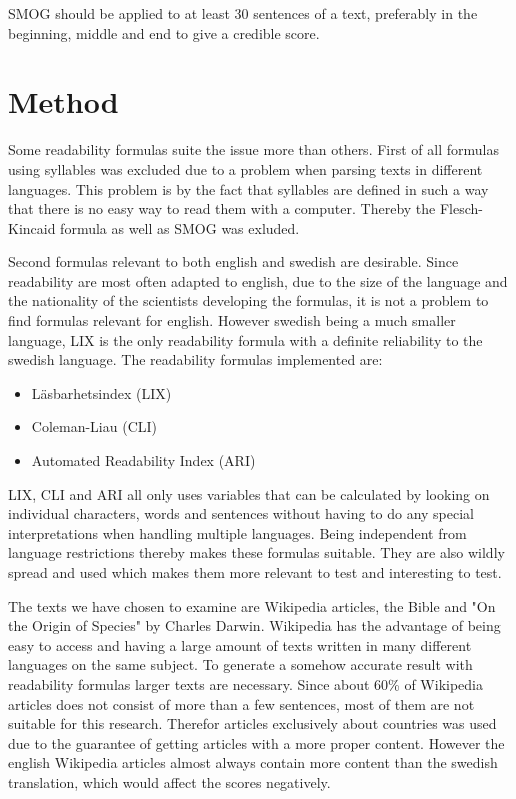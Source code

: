 \documentclass[a4paper]{article}
\begin{document}
SMOG should be applied to at least 30 sentences of a text, preferably in the beginning, middle and end to give a credible score\cite{laughlin69}.

\section{Method}
Some readability formulas suite the issue more than others. First of all formulas using syllables was excluded due to a problem when parsing texts in different languages. This problem is by the fact that syllables are defined in such a way that there is no easy way to read them with a computer\cite{coleman75}. Thereby the Flesch-Kincaid formula as well as SMOG was exluded. 

Second formulas relevant to both english and swedish are desirable. Since readability are most often adapted to english, due to the size of the language and the nationality of the scientists developing the formulas, it is not a problem to find formulas relevant for english. However swedish being a much smaller language, LIX is the only readability formula with a definite reliability to the swedish language. The readability formulas implemented are:
\begin{itemize}
    \item Läsbarhetsindex (LIX)
    \item Coleman-Liau (CLI)
    \item Automated Readability Index (ARI)
\end{itemize}
LIX, CLI and ARI all only uses variables that can be calculated by looking on individual characters, words and sentences without having to do any special interpretations when handling multiple languages. Being independent from language restrictions thereby makes these formulas suitable. They are also wildly spread and used which makes them more relevant to test and interesting to test.

The texts we have chosen to examine are Wikipedia articles, the Bible and "On the Origin of Species" by Charles Darwin\cite{darwinEN, darwinSV, bibleEN, bibleSV}. Wikipedia has the advantage of being easy to access and having a large amount of texts written in many different languages on the same subject. To generate a somehow accurate result with readability formulas larger texts are necessary. Since about 60\% of Wikipedia articles does not consist of more than a few sentences, most of them are not suitable for this research\cite{anderson12}. Therefor articles exclusively about countries was used due to the guarantee of getting articles with a more proper content. However the english Wikipedia articles almost always contain more content than the swedish translation, which would affect the scores negatively.
\end{document}
